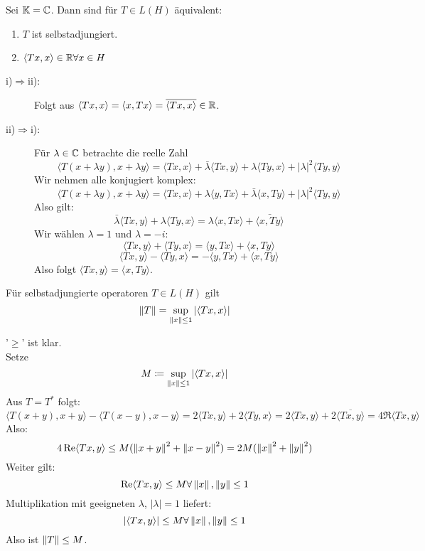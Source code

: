 \begin{satz}
	Sei $ \mathbb{K}=\mathbb{C} $. Dann sind f\"ur $ T\in L(H) $ \"aquivalent:
	\begin{enumerate}
		\item $ T $ ist selbstadjungiert.
	    \item $ \langle Tx,x\rangle\in\mathbb{R}\forall x\in H $
	\end{enumerate}
\end{satz}
\newpage
\begin{beweis}
	\begin{description}
		\item[i)$ \Rightarrow $ii):] Folgt aus $ \langle Tx,x\rangle=\langle x,Tx\rangle=\overline{\langle Tx,x\rangle}\in\mathbb{R} $.
		\item[ii)$ \Rightarrow $i):] F\"ur $ \lambda\in\mathbb{C} $ betrachte die reelle Zahl
		\[ \langle T(x+\lambda y),x+\lambda y\rangle=\langle Tx,x\rangle+\bar{\lambda}\langle Tx,y\rangle+\lambda\langle Ty,x\rangle+|\lambda|^2\langle Ty,y\rangle \]
		Wir nehmen alle konjugiert komplex:
		\[ \langle T(x+\lambda y),x+\lambda y\rangle=\langle Tx,x\rangle+ \lambda\langle y,Tx\rangle+\bar{\lambda}\langle x,Ty\rangle+|\lambda|^2\langle Ty,y\rangle \]
		Also gilt:
		\[ \bar{\lambda}\langle Tx,y\rangle+\lambda\langle Ty,x\rangle=\lambda\langle x,Tx\rangle+\bar{\langle x,Ty\rangle} \]
		Wir w\"ahlen $ \lambda=1 $ und $ \lambda=-i $:
		\[ \langle Tx,y\rangle+\langle Ty,x\rangle=\langle y,Tx\rangle+\langle x,Ty\rangle \]
		\[ \langle Tx,y\rangle-\langle Ty,x\rangle=-\langle y,Tx\rangle+\langle x,Ty\rangle \]
		Also folgt $ \langle Tx,y\rangle=\langle x,Ty\rangle $.
	\end{description}
\end{beweis}
\begin{satz}
	F\"ur selbstadjungierte operatoren $ T\in L(H) $ gilt
	\[ \left\|T\right\|=\sup_{\left\|x\right\|\leq 1} |\langle Tx,x\rangle|\]
\end{satz}
\begin{beweis}
	'$ \geq $' ist klar.\\
	Setze 
	\[ M\coloneqq\sup_{\left\|x\right\|\leq 1}|\langle Tx,x\rangle| \]
	Aus $ T=T^\ast $ folgt:
	\[ \langle T(x+y),x+y\rangle-\langle T(x-y),x-y\rangle=2\langle Tx,y\rangle+2\langle Ty,x\rangle=2\langle Tx,y\rangle+2\overline{\langle Tx,y\rangle}=4\Re\langle Tx,y\rangle \]
	Also:
	\[ 4\operatorname{Re}\langle Tx,y\rangle\leq M(\left\|x+y\right\|^2+\left\|x-y\right\|^2)=2M(\left\|x\right\|^2+\left\|y\right\|^2) \]
	Weiter gilt:
	\[ \operatorname{Re}\langle Tx,y\rangle\leq M\forall\left\|x\right\|,\left\|y\right\|\leq 1 \]
	Multiplikation mit geeigneten $ \lambda $, $ |\lambda|=1 $ liefert:
	\[ |\langle Tx,y\rangle|\leq M\forall\left\|x\right\|,\left\|y\right\|\leq 1 \]
    Also ist $ \left\|T\right\|\leq M $.
\end{beweis}
